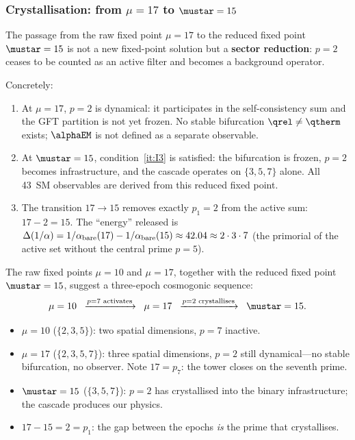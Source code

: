 \documentclass[12pt,a4paper]{article}
\begin{document}
\subsubsection{Crystallisation: from $\mu = 17$ to $\mustar = 15$}
\label{sec:ch8_crystallisation}

\begin{proposition}
\label{prop:crystallisation}
The passage from the raw fixed point $\mu = 17$ to the reduced fixed
point $\mustar = 15$ is not a new fixed-point solution but a
\textbf{sector reduction}: $p = 2$ ceases to be counted as an active
filter and becomes a background operator.

Concretely:
\begin{enumerate}[nosep]
\item At $\mu = 17$, $p = 2$ is dynamical: it participates in the
  self-consistency sum and the GFT partition is not yet frozen.
  No stable bifurcation $\qrel \neq \qtherm$ exists; $\alphaEM$
  is not defined as a separate observable.
\item At $\mustar = 15$, condition~\ref{it:I3} is satisfied:
  the bifurcation is frozen, $p = 2$ becomes infrastructure,
  and the cascade operates on $\{3,5,7\}$ alone.
  All 43~SM observables are derived from this reduced fixed point.
\item The transition $17 \to 15$ removes exactly $p_1 = 2$ from the
  active sum: $17 - 2 = 15$.  The ``energy'' released is
  $\Delta(1/\alpha) = 1/\alpha_{\rm bare}(17) - 1/\alpha_{\rm bare}(15)
  \approx 42.04 \approx 2 \cdot 3 \cdot 7$ (the primorial of the
  active set without the central prime $p = 5$).
\end{enumerate}
\end{proposition}

\begin{remark}
\label{rem:cosmogonic}
The raw fixed points $\mu = 10$ and $\mu = 17$, together with the
reduced fixed point $\mustar = 15$, suggest a three-epoch
cosmogonic sequence:
\[
  \mu = 10 \;\;\xrightarrow{p = 7 \text{ activates}}\;\;
  \mu = 17 \;\;\xrightarrow{p = 2 \text{ crystallises}}\;\;
  \mustar = 15.
\]
\begin{itemize}[nosep]
\item $\mu = 10$ ($\{2,3,5\}$): two spatial dimensions,
  $p = 7$ inactive.
\item $\mu = 17$ ($\{2,3,5,7\}$): three spatial dimensions,
  $p = 2$ still dynamical---no stable bifurcation, no observer.
  Note $17 = p_7$: the tower closes on the seventh prime.
\item $\mustar = 15$ ($\{3,5,7\}$): $p = 2$ has crystallised into
  the binary infrastructure; the cascade produces our physics.
\item $17 - 15 = 2 = p_1$: the gap between the epochs \emph{is}
  the prime that crystallises.
\end{itemize}
\end{remark}
\end{document}
